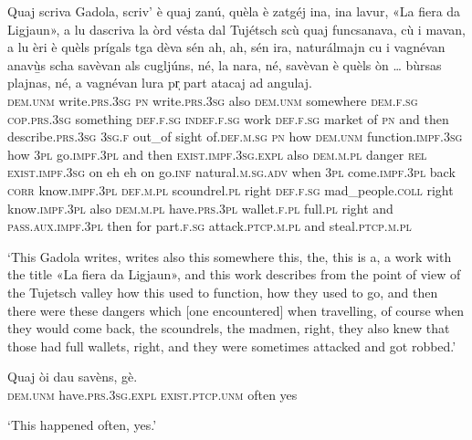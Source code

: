 \begin{linenumbers}
\gll Quaj scriva Gadola, scriv’ è quaj zanú, quèla è zatgéj ina, ina lavur, «La fiera da Ligjaun»\footnotemark, a lu dascriva la òrd vésta dal Tujétsch scù quaj funcsanava, cù i mavan, a lu èri è quèls prígals tga dèva sén ah, ah, sén ira, naturálmajn cu i vagnévan anavù̱s scha savèvan als cugljúns, né, la nara, né, savèvan è quèls òn … bùrsas plajnas, né, a vagnévan lura pr̩ part atacaj ad angulaj.\\
\textsc{dem.unm} write.\textsc{prs.3sg} \textsc{pn} write.\textsc{prs.3sg} also \textsc{dem.unm} somewhere \textsc{dem.f.sg} \textsc{cop.prs.3sg} something  \textsc{def.f.sg} \textsc{indef.f.sg} work \textsc{def.f.sg} market of \textsc{pn} and then describe.\textsc{prs.3sg} \textsc{3sg.f} out\_of sight of.\textsc{def.m.sg} \textsc{pn} how \textsc{dem.unm} function.\textsc{impf.3sg} how \textsc{3pl} go.\textsc{impf.3pl} and then \textsc{exist.impf.3sg.expl} also \textsc{dem.m.pl} danger \textsc{rel} \textsc{exist.impf.3sg} on eh eh on go.\textsc{inf} natural.\textsc{m.sg.adv} when \textsc{3pl} come.\textsc{impf.3pl} back \textsc{corr} know.\textsc{impf.3pl} \textsc{def.m.pl} scoundrel.\textsc{pl} right \textsc{def.f.sg} mad\_people.\textsc{coll} right know.\textsc{impf.3pl} also \textsc{dem.m.pl} have.\textsc{prs.3pl} {} wallet.\textsc{f.pl} full.\textsc{pl} right and \textsc{pass.aux.impf.3pl} then for part.\textsc{f.sg} attack.\textsc{ptcp.m.pl} and steal.\textsc{ptcp.m.pl}\\
\end{linenumbers}
\medskip
\glt `This Gadola writes, writes also this somewhere this, the, this is a, a work with the title «La fiera da Ligjaun», and this work describes from the point of view of the Tujetsch valley how this used to function, how they used to go, and then there were these dangers which [one encountered] when travelling, of course when they would come back, the scoundrels, the madmen, right, they also knew that those had full wallets, right, and they were sometimes attacked and got robbed.' 
\medskip

\begin{linenumbers}
\gll Quaj òi dau savèns, gè.\\
  \textsc{dem.unm} have.\textsc{prs.3sg.expl} \textsc{exist.ptcp.unm} often yes\\
\end{linenumbers}
\medskip
\glt `This happened often, yes.'
\medskip


